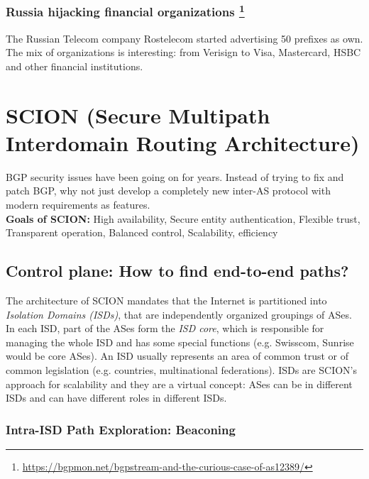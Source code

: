 \documentclass[11pt,oneside,a4paper]{article}
\begin{document}
\subsubsection[Russia hijacking financial organizations]{Russia hijacking financial organizations \footnote{\href{https://bgpmon.net/bgpstream-and-the-curious-case-of-as12389/}{https://bgpmon.net/bgpstream-and-the-curious-case-of-as12389/}}}

The Russian Telecom company Rostelecom started advertising 50 prefixes as own. The mix of organizations is interesting: from Verisign to Visa, Mastercard, HSBC and other financial institutions.

\newpage

\section{SCION \small (Secure Multipath Interdomain Routing Architecture)}

BGP security issues have been going on for years. Instead of trying to fix and patch BGP, why not just develop a completely new inter-AS protocol with modern requirements as features.\\

\textbf{Goals of SCION:} High availability, Secure entity authentication, Flexible trust, Transparent operation, Balanced control, Scalability, efficiency

\subsection{Control plane: How to find end-to-end paths?}

The architecture of SCION mandates that the Internet is partitioned into \textit{Isolation Domains (ISDs)}, that are independently organized groupings of ASes. In each ISD, part of the ASes form the \textit{ISD core}, which is responsible for managing the whole ISD and has some special functions (e.g. Swisscom, Sunrise would be core ASes). An ISD usually represents an area of common trust or of common legislation (e.g. countries, multinational federations). ISDs are SCION's approach for scalability and they are a virtual concept: ASes can be in different ISDs and can have different roles in different ISDs.

\subsubsection{Intra-ISD Path Exploration: Beaconing}
\end{document}

